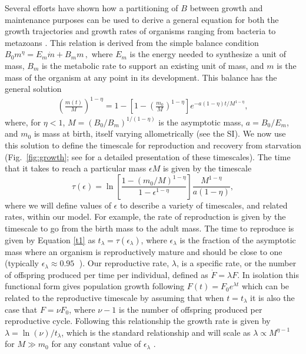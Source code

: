 \documentclass[twocolumn,preprintnumbers,amsmath,amssymb,superscriptaddress]{revtex4}
\begin{document}
{Several efforts have shown how a partitioning of $B$ between growth and
maintenance purposes can be used to derive a general equation for both the
growth trajectories and growth rates of organisms ranging from bacteria to
metazoans
\citep{West:2001bv,moses2008rmo,gillooly2002esa,hou,Kempes:2012hy}. This relation is derived from the simple balance condition 
$B_{0}m^{\eta}=E_{m}\dot{m}+B_{m}m\,,$
\citep{West:2001bv,moses2008rmo,gillooly2002esa,hou,Kempes:2012hy} where $E_{m}$ is the energy needed to synthesize a unit of mass, $B_{m}$ is
the metabolic rate to support an existing unit of mass, and $m$ is the mass
of the organism at any point in its development.  This balance has the
general solution \citep{bettencourt,Kempes:2012hy}
\begin{eqnarray}
\label{m1}
\left(\frac{m\left(t\right)}{M}\right)^{1-\eta}\!=1\!-\!\left[1\!-\!\left(\frac{m_{0}}{M}\right)^{1\!-\!\eta}\right]e^{-a\left(1\!-\!\eta\right)t/M^{1-\eta}},
\end{eqnarray}
where, for $\eta<1$, $M=(B_{0}/B_{m})^{1/(1-\eta)}$ is the asymptotic mass,
$a=B_{0}/E_{m}$, and $m_0$ is mass at birth, itself varying allometrically
(see the SI).  We now use this solution to define the timescale for
reproduction and recovery from starvation (Fig.~\ref{fig:growth}; see
\citep{moses2008rmo} for a detailed presentation of these timescales). The
time that it takes to reach a particular mass $\epsilon M$ is given by the
timescale
\begin{equation}
\label{t1}
\tau\left(\epsilon\right) = \ln\left[\frac{1-\left(m_{0}/M\right)^{1-\eta}}{1-\epsilon^{1-\eta}}\right]\frac{M^{1-\eta}}{a\left(1-\eta\right)},
\end{equation}
{\color{red} where we will define values of $\epsilon$ to describe a variety of timescales, and related rates, within
our model.  For example, the rate of reproduction is given by the timescale to go from the birth mass to the adult mass. The time to reproduce is given by Equation \ref{t1} as $t_{\lambda}=\tau\left(\epsilon_{\lambda}\right)$, where $\epsilon_{\lambda}$
is the fraction of the asymptotic mass where an organism is reproductively
mature and should be close to one (typically
$\epsilon_{\lambda}\approx0.95\;$ \citep{West:2001bv}). Our reproductive rate, $\lambda$, is a specific rate, or the number of offspring produced per time per individual, defined as $\dot{F} = \lambda F$. In isolation this functional form gives population growth following $F\left(t\right) = F_{0}e^{\lambda t}$ which can be related to the reproductive timescale by assuming that when $t=t_{\lambda}$ it is also the case that $F=\nu F_{0}$, where $\nu-1$ is the number of offspring produced per reproductive cycle. Following this relationship the growth rate is given by $\lambda=\ln\left(\nu\right)/t_{\lambda}$, which is the standard relationship \cite{} and will scale as $\lambda\propto M^{\eta-1}$ for $M\gg m_{0}$ for any constant value of $\epsilon_{\lambda}$
\citep{West:2001bv,moses2008rmo,gillooly2002esa,hou,Kempes:2012hy}.}


}
\end{document}
